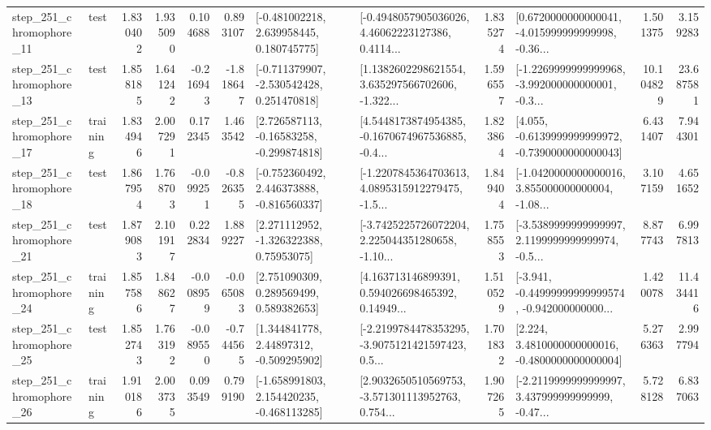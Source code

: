 \begin{tabular}{llrrrrllrlrr}
  step\_251\_chromophore\_11 &      test &      1.830402 &    1.935090 &      0.104688 &  0.893107 &    [-0.481002218, 2.639958445, 0.180745775] &  [-0.4948057905036026, 4.46062223127386, 0.4114... &       1.835274 &  [0.6720000000000041, -4.015999999999998, -0.36... &            1.501375 &          3.159283 \\
  step\_251\_chromophore\_13 &      test &      1.858185 &    1.641242 &     -0.216943 & -1.818647 &   [-0.711379907, -2.530542428, 0.251470818] &  [1.1382602298621554, 3.635297566702606, -1.322... &       1.596557 &  [-1.2269999999999968, -3.992000000000001, -0.3... &           10.104829 &         23.687581 \\
  step\_251\_chromophore\_17 &  training &      1.834946 &    2.007291 &      0.172345 &  1.463542 &    [2.726587113, -0.16583258, -0.299874818] &  [4.5448173874954385, -0.1670674967536885, -0.4... &       1.823864 &  [4.055, -0.6139999999999972, -0.7390000000000043] &            6.431407 &          7.944301 \\
  step\_251\_chromophore\_18 &      test &      1.867954 &    1.768703 &     -0.099251 & -0.826355 &   [-0.752360492, 2.446373888, -0.816560337] &  [-1.2207845364703613, 4.0895315912279475, -1.5... &       1.849404 &  [-1.0420000000000016, 3.855000000000004, -1.08... &            3.107159 &          4.651652 \\
  step\_251\_chromophore\_21 &      test &      1.879083 &    2.101917 &      0.222834 &  1.889227 &     [2.271112952, -1.326322388, 0.75953075] &  [-3.7425225726072204, 2.225044351280658, -1.10... &       1.758553 &  [-3.5389999999999997, 2.1199999999999974, -0.5... &            8.877743 &          6.997813 \\
  step\_251\_chromophore\_24 &  training &      1.857586 &    1.848627 &     -0.008959 & -0.065083 &     [2.751090309, 0.289569499, 0.589382653] &  [4.163713146899391, 0.594026698465392, 0.14949... &       1.510529 &  [-3.941, -0.44999999999999574, -0.942000000000... &            1.420078 &         11.434416 \\
  step\_251\_chromophore\_25 &      test &      1.852743 &    1.763192 &     -0.089550 & -0.744565 &     [1.344841778, 2.44897312, -0.509295902] &  [-2.2199784478353295, -3.9075121421597423, 0.5... &       1.701832 &   [2.224, 3.4810000000000016, -0.4800000000000004] &            5.276363 &          2.997794 \\
  step\_251\_chromophore\_26 &  training &      1.910186 &    2.003735 &      0.093549 &  0.799190 &   [-1.658991803, 2.154420235, -0.468113285] &  [2.9032650510569753, -3.571301113952763, 0.754... &       1.907265 &  [-2.2119999999999997, 3.437999999999999, -0.47... &            5.728128 &          6.837063 \\

\end{tabular}
